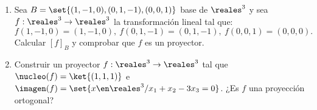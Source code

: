 \begin{enunciado}{\ejercicio}
  \begin{enumerate}[label=(\alph*)]
    \item Sea $B = \set{(1,-1,0),(0,1,-1),(0,0,1)}$ base de $\reales^3$ y sea $f: \reales^3 \to \reales^3$ la transformación lineal tal que:
          $$
            f(1, -1, 0) = (1,-1,0), \ f(0,1,-1) = (0,1,-1), \ f(0,0,1) = (0,0,0).
          $$
          Calcular $[f]_B$ y comprobar que $f$ es un proyector.

    \item Construir un proyector $f : \reales^3 \to \reales^3$ tal que $\nucleo(f) = \ket{(1,1,1)}$ e
          $\imagen(f) = \set{x \en \reales^3 / x_1 + x_2 - 3x_3 = 0}$. ¿Es $f$ una proyección ortogonal?
  \end{enumerate}
\end{enunciado}

